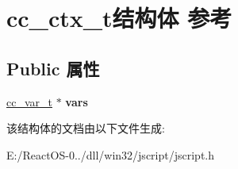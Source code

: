 \hypertarget{structcc__ctx__t}{}\section{cc\+\_\+ctx\+\_\+t结构体 参考}
\label{structcc__ctx__t}
\subsection*{Public 属性}
\begin{DoxyCompactItemize}
\item 
\mbox{\label{structcc__ctx__t_a156c295baa0151200cfe40a567203c06}} 
\hyperlink{struct__cc__var__t}{cc\+\_\+var\+\_\+t} $\ast$ {\bfseries vars}
\end{DoxyCompactItemize}


该结构体的文档由以下文件生成\+:\begin{DoxyCompactItemize}
\item 
E\+:/\+React\+O\+S-\/0../dll/win32/jscript/jscript.\+h\end{DoxyCompactItemize}
